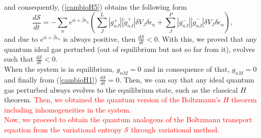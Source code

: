 \documentclass{article}
\newcommand{\de}{\delta}
\newcommand{\Ss}{\mathcal{S}}
\begin{document}
\\
and consequently, (\ref{cambioH5}) obtains the following form
\begin{equation}
    \frac{d\Ss}{dt}=-\sum_n  e^{\bar{\alpha}+\bar{\beta}\epsilon_n}\left(\sum_J ^{L} |g^{+}_{nJ}||\dot{g}^{+}_{nJ}|\de V_J \delta \epsilon_n+\sum^{P}_J  |g^{-}_{nJ}||\dot{g}^{-}_{nJ}| \de V_J \delta \epsilon_n \right), \label{cambioH6}
\end{equation}{}
and due to $e^{\bar{\alpha}+\bar{\beta}\epsilon_n}$ is always positive, then $\frac{d\Ss}{dt}<0$. With this, we proved that any quantum ideal gas perturbed (out of equilibrium but not so far from it), evolves such that $\frac{d\Ss}{dt}<0$.\\
When the system is in equilibrium, $g_{nM}=0$ and in consequence of that, $\dot g_{nM}=0$ and finally from (\ref{cambioH1}) $\frac{d\Ss}{dt}=0$. Then, we can say that any ideal quantum gas perturbed always evolves to the equilibrium state, such as the classical $H$ theorem. \textcolor{red}{Then, we obtained the quantum version of the Boltzmann's $H$ theorem including inhomogeneities in the system.\\
Now, we proceed to obtain the quantum analogous of the Boltzmann transport equation from the variational entropy $\Ss$ through variational method.}
  
  
\end{document}
